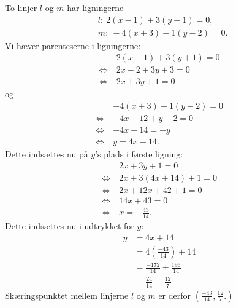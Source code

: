 \begin{exa}
	To linjer $l$ og $m$ har ligningerne 
	\begin{align*}
		&l: \ 2(x-1) + 3(y+1) = 0,\\
		&m: \ -4(x+3) + 1(y-2) = 0.
	\end{align*}
	Vi hæver parenteserne i ligningerne:
	\begin{align*}
		&2(x-1)+3(y+1) = 0 \\
		\Leftrightarrow \ &2x-2+3y+3=0\\
		\Leftrightarrow \ &2x+3y+1 = 0
	\end{align*}
	og
	\begin{align*}
		&-4(x+3) + 1(y-2) = 0\\
		\Leftrightarrow \ &-4x-12+y-2 = 0\\
		\Leftrightarrow \ &-4x-14 = -y\\
		\Leftrightarrow \ &y = 4x+14.
	\end{align*}
	Dette indsættes nu på $y$'s plads i første ligning:
	\begin{align*}
		 &2x+3y+1=0\\
		 \Leftrightarrow	\ &2x+3(4x+14) +1 = 0\\
		 \Leftrightarrow	\ &2x + 12x + 42+1 = 0\\
		 \Leftrightarrow \ &14x+43 = 0\\
		 \Leftrightarrow \ &x = -\frac{43}{14}.
	\end{align*}
	Dette indsættes nu i udtrykket for $y$:
	\begin{align*}
		y &= 4x+14 \\
		 &=4\left(\frac{-43}{14}
		\right) + 14\\
		&=\frac{-172}{14} + \frac{196}{14}\\
		&= \frac{24}{14} = \frac{12}{7}
	\end{align*}
	Skæringspunktet mellem linjerne $l$ og $m$ er derfor $\left(\frac{-43}{14},\frac{12}{7}.
	\right)$
\end{exa}

